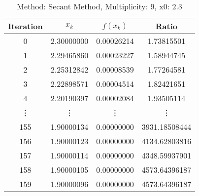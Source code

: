 \begin{table}
\centering
\caption{Method: Secant Method, Multiplicity: 9, x0: 2.3}
\label{tab:table_Secant_Method_9_2_3}
\begin{tabular}{c c c c}
\toprule
Iteration &      $x_k$ &   $f(x_k)$ &         Ratio \\
\midrule
        0 & 2.30000000 & 0.00026214 &    1.73815501 \\
        1 & 2.29465860 & 0.00023227 &    1.58944745 \\
        2 & 2.25312842 & 0.00008539 &    1.77264581 \\
        3 & 2.22898571 & 0.00004514 &    1.82421651 \\
        4 & 2.20190397 & 0.00002084 &    1.93505114 \\
   \vdots &     \vdots &     \vdots &        \vdots \\
      155 & 1.90000134 & 0.00000000 & 3931.18508444 \\
      156 & 1.90000123 & 0.00000000 & 4134.62803816 \\
      157 & 1.90000114 & 0.00000000 & 4348.59937901 \\
      158 & 1.90000105 & 0.00000000 & 4573.64396187 \\
      159 & 1.90000096 & 0.00000000 & 4573.64396187 \\
\bottomrule
\end{tabular}
\end{table}
